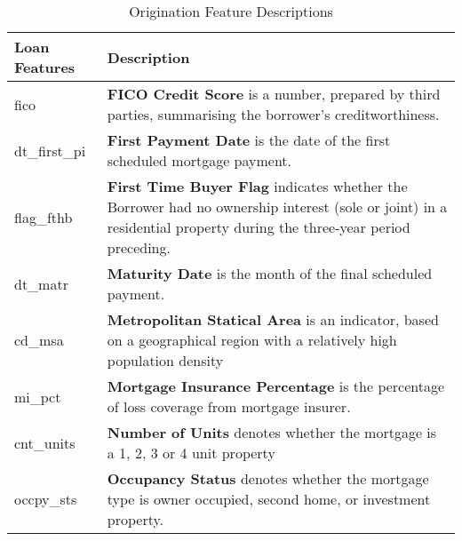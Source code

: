 \begin{appendices}
\renewcommand{\thefigure}{A.\arabic{figure}}
\renewcommand{\thetable}{A.\arabic{table}}






    \begin{table}[h]
        \centering
        \caption{Origination Feature Descriptions} \vspace{0.5cm}
        \label{appendix: table_american_loan_features_origination}
            \begin{tabular}{|p{4cm}|p{10cm}|}
                \hline \textbf{Loan Features} & \textbf{Description} \\ \hline \hline
                fico & \textbf{FICO Credit Score} is a number, prepared by third parties, summarising the borrower’s creditworthiness. \\ \hline
                dt\_first\_pi & \textbf{First Payment Date} is the date of the first scheduled mortgage payment.  \\ \hline
                flag\_fthb & \textbf{First Time Buyer Flag} indicates whether the Borrower had no ownership interest (sole or joint) in a residential property during the three-year period preceding. \\ \hline
                dt\_matr & \textbf{Maturity Date} is the month of the final scheduled payment. \\ \hline
                cd\_msa & \textbf{Metropolitan Statical Area} is an indicator, based on a geographical region with a relatively high population density\\ \hline
                mi\_pct & \textbf{Mortgage Insurance Percentage} is the percentage of loss coverage from mortgage insurer. \\ \hline
                cnt\_units & \textbf{Number of Units} denotes whether the mortgage is a 1, 2, 3 or 4 unit property \\ \hline
                occpy\_sts & \textbf{Occupancy Status} denotes whether the mortgage type is owner occupied, second home, or investment property. \\ \hline

\end{tabular}
\end{table}
\end{appendices}
